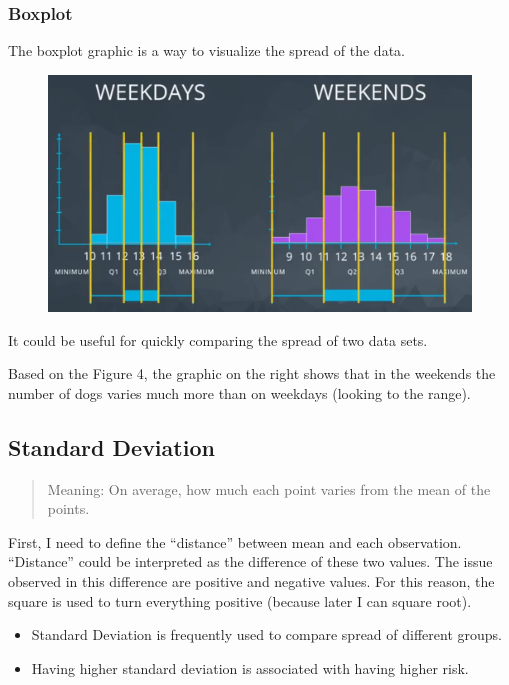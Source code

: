 \documentclass[]{book}
\providecommand{\tightlist}{%
  \setlength{\itemsep}{0pt}\setlength{\parskip}{0pt}}
\begin{document}
\subsubsection{Boxplot}\label{boxplot}

The boxplot graphic is a way to visualize the spread of the data.

\begin{figure}
\centering
\includegraphics{01-img/c4_l2_04.png}
\caption{}
\end{figure}

It could be useful for quickly comparing the spread of two data sets.

Based on the Figure 4, the graphic on the right shows that in the
weekends the number of dogs varies much more than on weekdays (looking
to the range).

\subsection{Standard Deviation}\label{standard-deviation}

\begin{quote}
Meaning: On average, how much each point varies from the mean of the
points.
\end{quote}

First, I need to define the ``distance'' between mean and each
observation. ``Distance'' could be interpreted as the difference of
these two values. The issue observed in this difference are positive and
negative values. For this reason, the square is used to turn everything
positive (because later I can square root).

\begin{itemize}
\tightlist
\item
  Standard Deviation is frequently used to compare spread of different
  groups.
\item
  Having higher standard deviation is associated with having higher
  risk.
\end{itemize}
\end{document}

